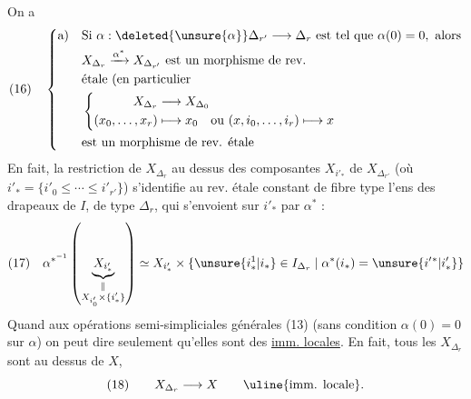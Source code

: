 On a
\[
(16)\quad\left\{\begin{aligned}
\text{a)}\quad&\text{Si }\alpha:\deleted{\unsure{\alpha}}\Delta_{r'}\longrightarrow\Delta_r\text{ est tel que }\alpha(0)=0,\text{ alors}\\
&X_{\Delta_r}\xrightarrow{\alpha^*}X_{\Delta_{r'}}\text{ est un morphisme de rev.}\\
&\text{étale (en particulier}\\
&\left\{\begin{aligned}
X_{\Delta_r}&\longrightarrow X_{\Delta_0}\\
(x_0,\ldots,x_r)&\longmapsto x_0\quad\text{ou }(x,i_0,\ldots,i_r)\longmapsto x
\end{aligned}\right.\\
&\text{est un morphisme de rev. étale}
\end{aligned}\right.
\]
En fait, la  restriction de $X_{\Delta_r}$ au
dessus des composantes $X_{i'_*}$  de $X_{\Delta_{r'}}$
(où $i'_* = \{i'_0\leq\cdots\leq i'_{r'}\}$)  s'identifie
au rev. étale constant de fibre type l'ens
des drapeaux  de $I$, de type $\Delta_r$, qui
s'envoient sur $i'_*$ par $\alpha^*$ :
\[
(17)\quad\alpha^{*^{-1}}\left(\underbrace{X_{i'_*}}_{\substack{\Vert\\X_{i'_0}\times\{i'_*\}}}\right)
\simeq X_{i'_*}\times\{\unsure{i^1_*|i_*}\in I_{\Delta_r}\mid\alpha^*(i_*)=\unsure{i'{}^*|i'_*}\}
\]
Quand aux opérations semi-simpliciales
générales (13) (sans condition $\alpha(0)=0$ sur
$\alpha$) on peut dire seulement qu'elles sont
des \uline{imm. locales}. En fait, tous les
$X_{\Delta_r}$ sont au dessus de $X$, 
\[
(18)\qquad X_{\Delta_r}\longrightarrow X\qquad\text{\uline{imm. locale}}.
\]
